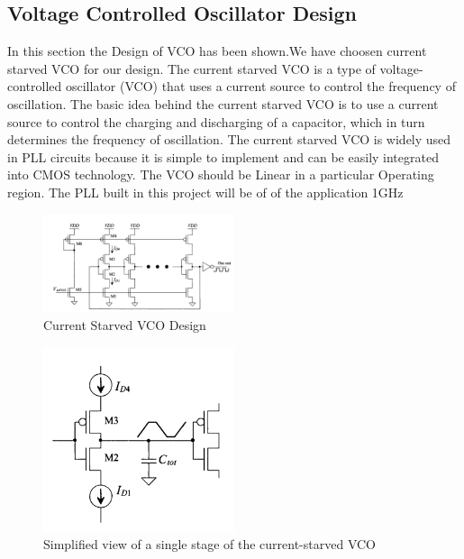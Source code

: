 \subsection{Voltage Controlled Oscillator Design}
In this section the Design of VCO has been shown.We have choosen current starved VCO for our design. The current starved VCO is a type of voltage-controlled oscillator (VCO) that uses a current source to control the frequency of oscillation. The basic idea behind the current starved VCO is to use a current source to control the charging and discharging of a capacitor, which in turn determines the frequency of oscillation. The current starved VCO is widely used in PLL circuits because it is simple to implement and can be easily integrated into CMOS technology.
The VCO should be Linear in a particular Operating region. The PLL built in this project will be of of the application 1GHz


\begin{figure}[h]
	\centering
	\includegraphics[width=0.5\textwidth]{figs/cs_vco_design.png}
	\caption{Current Starved VCO Design}
	\label{fig:cs_vco_design}
	\vspace{0.5cm}
\end{figure}
\begin{figure}[h]
	\centering
	\includegraphics[width=0.5\textwidth]{figs/vco_simplified.png}
	\caption{Simplified view of a single stage of the current-starved VCO}
	\label{fig:vco_simplified}
\end{figure}

